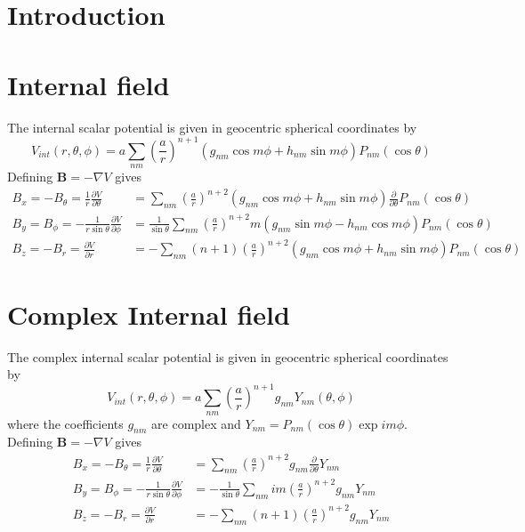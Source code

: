 \documentclass{article}
\begin{document}
\section{Introduction}

\section{Internal field}
\label{sec:internal}

The internal scalar potential is given in geocentric spherical coordinates by
\begin{equation}
V_{int}(r,\theta,\phi) = a \sum_{nm} \left( \frac{a}{r} \right)^{n+1} \left( g_{nm} \cos{m \phi} + h_{nm} \sin{m \phi} \right)
P_{nm}(\cos{\theta})
\end{equation}
Defining $\mathbf{B} = - \nabla V$ gives
\begin{align}
B_x = -B_{\theta} = \frac{1}{r} \frac{\partial V}{\partial \theta} &= \sum_{nm} \left( \frac{a}{r} \right)^{n+2}
\left( g_{nm} \cos{m \phi} + h_{nm}\sin{m \phi} \right) \frac{\partial}{\partial \theta} P_{nm}(\cos{\theta}) \\
B_y = B_{\phi} = -\frac{1}{r \sin{\theta}} \frac{\partial V}{\partial \phi} &= \frac{1}{\sin{\theta}} \sum_{nm}
\left( \frac{a}{r} \right)^{n+2} m \left( g_{nm} \sin{m \phi} - h_{nm} \cos{m \phi} \right) P_{nm}(\cos{\theta}) \\
B_z = -B_r = \frac{\partial V}{\partial r} &= -\sum_{nm} (n + 1) \left( \frac{a}{r} \right)^{n+2}
\left( g_{nm} \cos{m \phi} + h_{nm}\sin{m \phi} \right) P_{nm}(\cos{\theta})
\end{align}

\section{Complex Internal field}
\label{sec:internal_complex}

The complex internal scalar potential is given in geocentric spherical coordinates by
\begin{equation}
V_{int}(r,\theta,\phi) = a \sum_{nm} \left( \frac{a}{r} \right)^{n+1} g_{nm} Y_{nm}(\theta,\phi)
\end{equation}
where the coefficients $g_{nm}$ are complex and $Y_{nm} = P_{nm}(\cos{\theta}) \exp{im\phi}$.
Defining $\mathbf{B} = - \nabla V$ gives
\begin{align}
B_x = -B_{\theta} = \frac{1}{r} \frac{\partial V}{\partial \theta} &= \sum_{nm} \left( \frac{a}{r} \right)^{n+2}
g_{nm} \frac{\partial}{\partial \theta} Y_{nm} \\
B_y = B_{\phi} = -\frac{1}{r \sin{\theta}} \frac{\partial V}{\partial \phi} &= -\frac{1}{\sin{\theta}} \sum_{nm}
im \left( \frac{a}{r} \right)^{n+2} g_{nm} Y_{nm} \\
B_z = -B_r = \frac{\partial V}{\partial r} &= -\sum_{nm} (n + 1) \left( \frac{a}{r} \right)^{n+2} g_{nm} Y_{nm}
\end{align}
\end{document}
